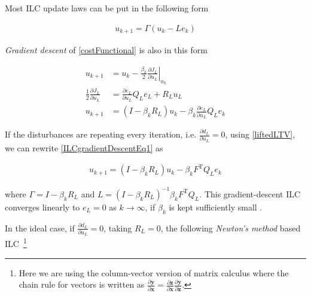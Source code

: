 \documentclass[10pt,a4paper]{article}
\newcommand\at[2]{\left.#1\right|_{#2}} %
\newcommand{\error}{e} %
\newcommand{\linDist}{d} %
\newcommand{\sysInput}{u} %
\newcommand{\qmatrix}{\Gamma} %
\newcommand{\lmatrix}{L} %
\newcommand{\ValueFunction}{J}
\begin{document}
\noindent Most ILC update laws can be put in the following form

\begin{equation}
\begin{aligned}
\sysInput_{k+1} = \qmatrix(\sysInput_{k} - \lmatrix\error_{k})
\end{aligned}
\label{ILCupdateForm}
\end{equation}

\noindent \emph{Gradient descent} of \eqref{costFunctional} is also in this form

\begin{equation}
\begin{aligned}
\sysInput_{k+1} &= \sysInput_k - \frac{\beta_k}{2} \at{\frac{\partial{\ValueFunction_L}}{\partial{\sysInput_L}}}{\sysInput_k} \\
\frac{1}{2}\frac{\partial{\ValueFunction_L}}{\partial{\sysInput_L}} &= \frac{\partial{\error_L}}{\partial{\sysInput_L}}Q_L\error_L + R_L\sysInput_L \\
\sysInput_{k+1} &= (I - \beta_kR_L)\sysInput_k - \beta_k\frac{\partial{\error_L}}{\partial{\sysInput_L}}Q_L\error_k
\end{aligned}
\label{ILCgradientDescentEq1}
\end{equation}

\noindent If the disturbances are repeating every iteration, i.e. $\frac{\partial{\linDist_L}}{\partial{\sysInput_L}} = 0$, using \eqref{liftedLTV}, we can rewrite \eqref{ILCgradientDescentEq1} as

\begin{equation}
\begin{aligned}
\sysInput_{k+1} = (I - \beta_kR_L)\sysInput_k - \beta_kF^\mathrm{T}Q_L\error_k
\end{aligned}
\label{ILCgradientDescentEq2}
\end{equation}

\noindent where $\qmatrix = I - \beta_kR_L$ and $\lmatrix = (I - \beta_kR_L)^{-1}\beta_kF^\mathrm{T}Q_L$. This gradient-descent ILC converges linearly to $\error_L = 0$ as $k \to \infty$, if $\beta_k$ is kept sufficiently small \cite{Nocedal99}.

In the ideal case, if $\frac{\partial{\linDist_L}}{\partial{\sysInput_L}} = 0$, taking $R_L = 0$, the following \emph{Newton's method} based ILC~\footnote{Here we are using the column-vector version of matrix calculus where the chain rule for vectors is written as $\frac{\partial\mathbf{y}}{\partial\mathbf{x}} = \frac{\partial\mathbf{z}}{\partial\mathbf{x}}\frac{\partial\mathbf{y}}{\partial\mathbf{z}}$.}
\end{document}
